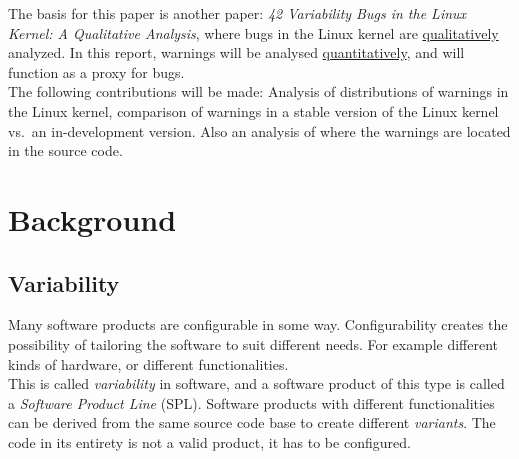 \documentclass[a4paper,11pt]{report}
\begin{document}
The basis for this paper is another  paper: \emph{42 Variability 
Bugs in the Linux Kernel: A Qualitative Analysis}\cite{42bugs}, where bugs in 
the Linux kernel are \underline{qualitatively} analyzed. In this report, warnings will be 
analysed \underline{quantitatively}, and will function as a proxy for bugs.
\\

The following contributions will be made: Analysis of distributions of warnings 
in the Linux kernel, comparison of warnings in a stable version of the Linux 
kernel vs.\ an in-development version. Also an analysis of where the warnings 
are located in the source code.

\newpage
        \chapter{Background}

            \section{Variability}

Many software products are configurable in some way. Configurability creates the 
possibility of tailoring the software to suit different needs. For example 
different kinds of hardware, or different functionalities. 
\\

This is called \emph{variability} in software, and a software product of 
this type is called a \emph{Software Product Line} (SPL). Software products 
with different functionalities can be derived from the same 
source code base to create different \emph{variants}. The code in its entirety is not a valid product\cite[p. 
1]{IntDatSPL}, it has to be configured.
\\

        \def \fn {14,387 across all architectures, with an average of 9,984 per 
        architecture, and 10,335 for the \texttt{x86} architecture, which is used
        in this project.}
\end{document}
